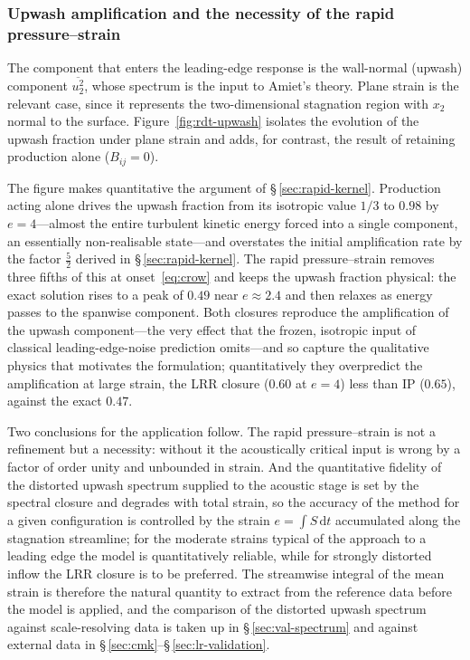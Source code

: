 \documentclass[lineno]{JFM-FLM_Au}
\begin{document}
\subsubsection{Upwash amplification and the necessity of the rapid
pressure--strain}\label{sec:upwash-verif}

The component that enters the leading-edge response is the wall-normal
(upwash) component $\overline{u_2^2}$, whose spectrum is the input to
Amiet's theory. Plane strain is the relevant case, since it represents the
two-dimensional stagnation region with $x_2$ normal to the surface.
Figure~\ref{fig:rdt-upwash} isolates the evolution of the upwash fraction
under plane strain and adds, for contrast, the result of retaining
production alone ($B_{ij}=0$).

The figure makes quantitative the argument of \S\,\ref{sec:rapid-kernel}.
Production acting alone drives the upwash fraction from its isotropic value
$1/3$ to $0.98$ by $e=4$---almost the entire turbulent kinetic energy
forced into a single component, an essentially non-realisable state---and
overstates the initial amplification rate by the factor $\tfrac52$ derived
in \S\,\ref{sec:rapid-kernel}. The rapid pressure--strain removes three
fifths of this at onset~\eqref{eq:crow} and keeps the upwash fraction
physical: the exact solution rises to a peak of $0.49$ near $e\approx2.4$
and then relaxes as energy passes to the spanwise component. Both closures
reproduce the amplification of the upwash component---the very effect that
the frozen, isotropic input of classical leading-edge-noise prediction
omits---and so capture the qualitative physics that motivates the
formulation; quantitatively they overpredict the amplification at large
strain, the LRR closure ($0.60$ at $e=4$) less than IP ($0.65$), against
the exact $0.47$.

Two conclusions for the application follow. The rapid pressure--strain is
not a refinement but a necessity: without it the acoustically critical
input is wrong by a factor of order unity and unbounded in strain. And the
quantitative fidelity of the distorted upwash spectrum supplied to the
acoustic stage is set by the spectral closure and degrades with total
strain, so the accuracy of the method for a given configuration is
controlled by the strain $e=\int S\,\mathrm{d}t$ accumulated along the
stagnation streamline; for the moderate strains typical of the approach to
a leading edge the model is quantitatively reliable, while for strongly
distorted inflow the LRR closure is to be preferred. The streamwise
integral of the mean strain is therefore the natural quantity to extract
from the reference data before the model is applied, and the comparison of
the distorted upwash spectrum against scale-resolving data is taken up in
\S\,\ref{sec:val-spectrum} and against external data in
\S\,\ref{sec:cmk}--\S\,\ref{sec:lr-validation}.
\end{document}
